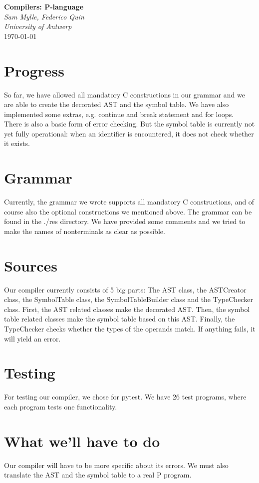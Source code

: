\documentclass{article}
\begin{document}
\begin{titlepage}
   \begin{center}
      \Large\textbf{Compilers: P-language}\\
      \large\textit{Sam Mylle, Federico Quin \\ University of Antwerp} \\
      \today
   \end{center}
\end{titlepage}

\section{Progress}
So far, we have allowed all mandatory C constructions in our grammar and we are able to create the decorated AST and the symbol table. We have also implemented some extras, e.g. continue and break statement and for loops. \\
There is also a basic form of error checking. But the symbol table is currently not yet fully operational: when an identifier is encountered, it does not check whether it exists.

\section{Grammar}
Currently, the grammar we wrote supports all mandatory C constructions, and of course also the optional constructions we mentioned above. The grammar can be found in the ./res directory. We have provided some comments and we tried to make the names of nonterminals as clear as possible.

\section{Sources}
Our compiler currently consists of 5 big parts: The AST class, the ASTCreator class, the SymbolTable class, the SymbolTableBuilder class and the TypeChecker class.
First, the AST related classes make the decorated AST. Then, the symbol table related classes make the symbol table based on this AST. Finally, the TypeChecker checks whether the types of the operands match. If anything fails, it will yield an error.

\section{Testing}
For testing our compiler, we chose for pytest. We have 26 test programs, where each program tests one functionality. 

\section{What we'll have to do}
Our compiler will have to be more specific about its errors. We must also translate the AST and the symbol table to a real P program. 
\end{document}

